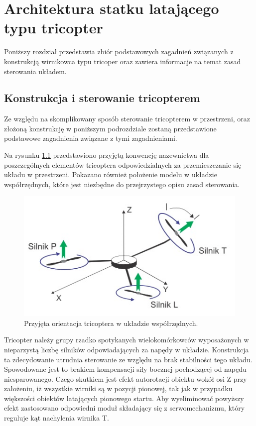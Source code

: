 \chapter{Architektura statku latającego typu tricopter}
\label{cha:architektura_statku_latajacego_typu_tricopter}

Poniższy rozdział przedstawia zbiór podstawowych zagadnień związanych z konstrukcją wirnikowca typu tricoper oraz zawiera informacje na temat zasad sterowania układem.

\section{Konstrukcja i sterowanie tricopterem}

Ze względu na skomplikowany sposób sterowanie tricopterem w przestrzeni, oraz złożoną konstrukcję w poniższym podrozdziale zostaną przedstawione podstawowe zagadnienia związane z tymi zagadnieniami.

Na rysunku \ref{fig:orientation} przedstawiono przyjętą konwencję nazewnictwa dla poszczególnych elementów tricoptera odpowiedzialnych za przemieszczanie się układu w przestrzeni. Pokazano również położenie modelu w układzie współrzędnych, które jest niezbędne do przejrzystego opisu zasad sterowania.

\begin{figure}[!htbp]
\centering
\includegraphics[width=0.7\linewidth]{./include/orientation}
\caption{Przyjęta orientacja tricoptera w układzie współrzędnych.}
\label{fig:orientation}
\end{figure}

Tricopter należy grupy rzadko spotykanych wielokomórkowców wyposażonych w nieparzystą liczbę silników odpowiadających za napędy w układzie.
Konstrukcja ta zdecydowanie utrudnia sterowanie ze względu na brak stabilności tego układu. Spowodowane jest to brakiem kompensacji siły bocznej pochodzącej od napędu niesparowanego. Czego skutkiem jest  efekt autorotacji obiektu wokół osi Z przy założeniu, iż wszystkie wirniki są w pozycji pionowej, tak jak w przypadku większości obiektów latających pionowego startu. Aby wyeliminować powyższy efekt zastosowano odpowiedni moduł składający się z serwomechanizmu, który reguluje kąt nachylenia wirnika T.


